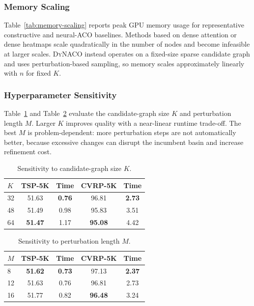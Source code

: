 \documentclass[sigconf]{acmart}
\newcommand{\DyNACO}{\textsc{DyNACO}}
\begin{document}
\subsubsection{Memory Scaling}

Table~\ref{tab:memory-scaling} reports peak GPU memory usage for representative constructive and neural-ACO baselines.
Methods based on dense attention or dense heatmaps scale quadratically in the number of nodes and become infeasible at larger scales.
\DyNACO{} instead operates on a fixed-size sparse candidate graph and uses perturbation-based sampling, so memory scales approximately linearly with $n$ for fixed $K$.

\subsubsection{Hyperparameter Sensitivity}

Table~\ref{tab:k-sensitivity-app} and Table~\ref{tab:m-sensitivity-app} evaluate the candidate-graph size $K$ and perturbation length $M$.
Larger $K$ improves quality with a near-linear runtime trade-off.
The best $M$ is problem-dependent: more perturbation steps are not automatically better, because excessive changes can disrupt the incumbent basin and increase refinement cost.

\begin{table}[t]
\centering
\caption{Sensitivity to candidate-graph size $K$.}
\label{tab:k-sensitivity-app}
\small
\renewcommand{\arraystretch}{0.85}
\begin{tabular*}{\columnwidth}{@{\extracolsep{\fill}}lcccc@{}}
\toprule
$K$ & TSP-5K & Time & CVRP-5K & Time \\
\midrule
32 & 51.63 & \textbf{0.76} & 96.81 & \textbf{2.73} \\
48 & 51.49 & 0.98 & 95.83 & 3.51 \\
64 & \textbf{51.47} & 1.17 & \textbf{95.08} & 4.42 \\
\bottomrule
\end{tabular*}
\end{table}

\begin{table}[t]
\centering
\caption{Sensitivity to perturbation length $M$.}
\label{tab:m-sensitivity-app}
\small
\renewcommand{\arraystretch}{0.85}
\begin{tabular*}{\columnwidth}{@{\extracolsep{\fill}}lcccc@{}}
\toprule
$M$ & TSP-5K & Time & CVRP-5K & Time \\
\midrule
8 & \textbf{51.62} & \textbf{0.73} & 97.13 & \textbf{2.37} \\
12 & 51.63 & 0.76 & 96.81 & 2.73 \\
16 & 51.77 & 0.82 & \textbf{96.48} & 3.24 \\
\bottomrule
\end{tabular*}
\end{table}
\end{document}

